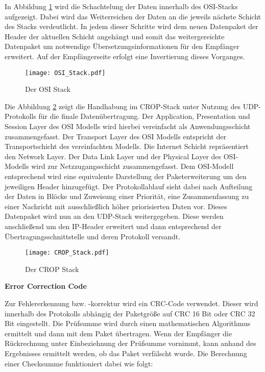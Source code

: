 In Abbildung \ref{fig:OSI_Stack} wird die Schachtelung der Daten
innerhalb des OSI-Stacks aufgezeigt. Dabei wird das Weiterreichen der Daten an
die jeweils n{\"a}chste Schicht des Stacks verdeutlicht. In jedem dieser Schritte wird dem neuen
Datenpaket der Header der aktuellen Schicht angeh{\"a}ngt und somit das
weitergereichte Datenpaket um notwendige {\"U}bersetzungsinformationen f{\"u}r
den Empf{\"a}nger erweitert. Auf der Empf{\"a}ngerseite erfolgt eine Invertierung dieses
Vorganges. 

\begin{figure}[H]
\centering
\texttt{[image: OSI\_Stack.pdf]}
\caption{Der OSI Stack}
\label{fig:OSI_Stack}
\end{figure}
 
Die Abbildung \ref{fig:CROP_Stack} zeigt die Handhabung im CROP-Stack
unter Nutzung des UDP-Protokolls f{\"u}r die finale Daten{\"u}bertragung. Der
Application, Presentation und Session Layer des OSI Modells
wird hierbei vereinfacht als Anwendungsschicht zusammengefasst.
Der Transport Layer des OSI Modells entspricht der Transportschicht des
vereinfachten Modells. Die Internet Schicht repr{\"a}sentiert den Network
Layer.
Der Data Link Layer und der Physical Layer des OSI-Modells wird zur
Netzzugangsschicht zusammengefasst. Dem OSI-Modell entsprechend wird eine
equivalente Darstellung der Paketerweiterung um den jeweiligen Header
hinzugef{\"u}gt. Der Protokollablauf sieht dabei nach Aufteilung der Daten in
Bl{\"o}cke und Zuweisung einer Priorit{\"a}t, eine Zusammenfassung zu einer
Nachricht mit ausschließlich höher priorisierten Daten vor. Dieses Datenpaket
wird nun an den UDP-Stack weitergegeben. Diese werden
anschlie{\ss}end um den IP-Header erweitert und dann entsprechend
der {\"U}bertragungsschnittstelle und deren Protokoll versandt.

\begin{figure}[H]
\centering
\texttt{[image: CROP\_Stack.pdf]}
\caption{Der CROP Stack}
\label{fig:CROP_Stack}
\end{figure}

\textbf{Error Correction Code}

Zur Fehlererkennung bzw. -korrektur wird ein CRC-Code verwendet. Dieser wird
innerhalb des Protokolls abhängig der Paketgr{\"o}{\ss}e auf CRC 16 Bit oder
CRC 32 Bit eingestellt. Die Pr{\"u}fsumme wird durch einen mathematischen
Algorithmus ermittelt und dann mit dem Paket {\"u}bertragen. Wenn der
Empf{\"a}nger die R{\"u}ckrechnung unter Einbeziehnung der Pr{\"u}fsumme
vornimmt, kann anhand des Ergebnisses ermittelt werden, ob das Paket
verf{\"a}lscht wurde. Die Berechnung einer Checksumme funktioniert dabei wie
folgt:

